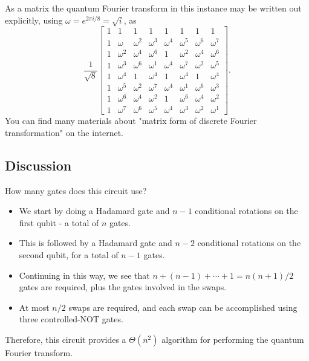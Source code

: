 As a matrix the quantum Fourier transform in this instance may be written out explicitly, using $\omega=e^{2 \pi i / 8}=\sqrt{i}$, as
\begin{equation*}
\frac{1}{\sqrt{8}}\left[\begin{array}{cccccccc}
1 & 1 & 1 & 1 & 1 & 1 & 1 & 1  \tag{5.19}\\
1 & \omega & \omega^{2} & \omega^{3} & \omega^{4} & \omega^{5} & \omega^{6} & \omega^{7} \\
1 & \omega^{2} & \omega^{4} & \omega^{6} & 1 & \omega^{2} & \omega^{4} & \omega^{6} \\
1 & \omega^{3} & \omega^{6} & \omega^{1} & \omega^{4} & \omega^{7} & \omega^{2} & \omega^{5} \\
1 & \omega^{4} & 1 & \omega^{4} & 1 & \omega^{4} & 1 & \omega^{4} \\
1 & \omega^{5} & \omega^{2} & \omega^{7} & \omega^{4} & \omega^{1} & \omega^{6} & \omega^{3} \\
1 & \omega^{6} & \omega^{4} & \omega^{2} & 1 & \omega^{6} & \omega^{4} & \omega^{2} \\
1 & \omega^{7} & \omega^{6} & \omega^{5} & \omega^{4} & \omega^{3} & \omega^{2} & \omega^{1}
\end{array}\right] .
\end{equation*}
You can find many materials about "matrix form of discrete Fourier transformation" on the internet.

\subsection{Discussion}

How many gates does this circuit use? 
\begin{itemize}
    \item We start by doing a Hadamard gate and $n-1$ conditional rotations on the first qubit - a total of $n$ gates.
    \item This is followed by a Hadamard gate and $n-2$ conditional rotations on the second qubit, for a total of $n-1$ gates.
    \item Continuing in this way, we see that $n+(n-1)+\cdots+1=n(n+1) / 2$ gates are required, plus the gates involved in the swaps.
    \item At most $n / 2$ swaps are required, and each swap can be accomplished using three controlled-NOT gates. 
\end{itemize}
Therefore, this circuit provides a $\Theta(n^{2})$ algorithm for performing the quantum Fourier transform.

